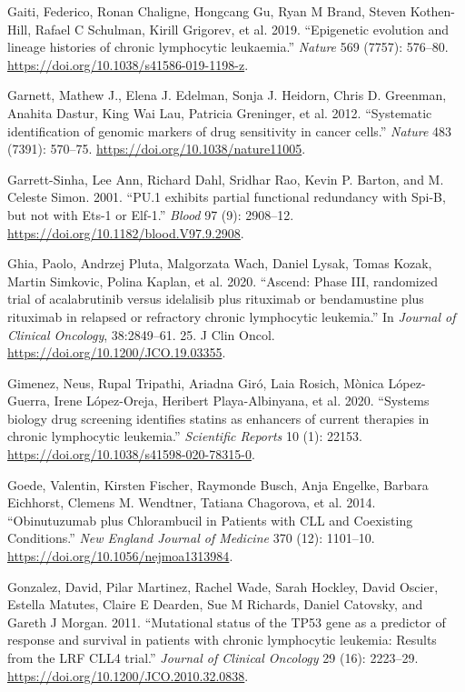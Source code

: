 \documentclass[11pt, a4paper, twosided]{book}
\newenvironment{CSLReferences}%
  {}%
  {\par}
\begin{document}
\begin{CSLReferences}{1}{0}
\leavevmode{}%
Gaiti, Federico, Ronan Chaligne, Hongcang Gu, Ryan M Brand, Steven Kothen-Hill, Rafael C Schulman, Kirill Grigorev, et al. 2019. {``{Epigenetic evolution and lineage histories of chronic lymphocytic leukaemia}.''} \emph{Nature} 569 (7757): 576--80. \url{https://doi.org/10.1038/s41586-019-1198-z}.

\leavevmode{}%
Garnett, Mathew J., Elena J. Edelman, Sonja J. Heidorn, Chris D. Greenman, Anahita Dastur, King Wai Lau, Patricia Greninger, et al. 2012. {``{Systematic identification of genomic markers of drug sensitivity in cancer cells}.''} \emph{Nature} 483 (7391): 570--75. \url{https://doi.org/10.1038/nature11005}.

\leavevmode{}%
Garrett-Sinha, Lee Ann, Richard Dahl, Sridhar Rao, Kevin P. Barton, and M. Celeste Simon. 2001. {``{PU.1 exhibits partial functional redundancy with Spi-B, but not with Ets-1 or Elf-1}.''} \emph{Blood} 97 (9): 2908--12. \url{https://doi.org/10.1182/blood.V97.9.2908}.

\leavevmode{}%
Ghia, Paolo, Andrzej Pluta, Malgorzata Wach, Daniel Lysak, Tomas Kozak, Martin Simkovic, Polina Kaplan, et al. 2020. {``{Ascend: Phase III, randomized trial of acalabrutinib versus idelalisib plus rituximab or bendamustine plus rituximab in relapsed or refractory chronic lymphocytic leukemia}.''} In \emph{Journal of Clinical Oncology}, 38:2849--61. 25. J Clin Oncol. \url{https://doi.org/10.1200/JCO.19.03355}.

\leavevmode{}%
Gimenez, Neus, Rupal Tripathi, Ariadna Giró, Laia Rosich, Mònica López-Guerra, Irene López-Oreja, Heribert Playa-Albinyana, et al. 2020. {``{Systems biology drug screening identifies statins as enhancers of current therapies in chronic lymphocytic leukemia.}''} \emph{Scientific Reports} 10 (1): 22153. \url{https://doi.org/10.1038/s41598-020-78315-0}.

\leavevmode{}%
Goede, Valentin, Kirsten Fischer, Raymonde Busch, Anja Engelke, Barbara Eichhorst, Clemens M. Wendtner, Tatiana Chagorova, et al. 2014. {``{Obinutuzumab plus Chlorambucil in Patients with CLL and Coexisting Conditions}.''} \emph{New England Journal of Medicine} 370 (12): 1101--10. \url{https://doi.org/10.1056/nejmoa1313984}.

\leavevmode{}%
Gonzalez, David, Pilar Martinez, Rachel Wade, Sarah Hockley, David Oscier, Estella Matutes, Claire E Dearden, Sue M Richards, Daniel Catovsky, and Gareth J Morgan. 2011. {``{Mutational status of the TP53 gene as a predictor of response and survival in patients with chronic lymphocytic leukemia: Results from the LRF CLL4 trial}.''} \emph{Journal of Clinical Oncology} 29 (16): 2223--29. \url{https://doi.org/10.1200/JCO.2010.32.0838}.


\end{CSLReferences}
\end{document}
